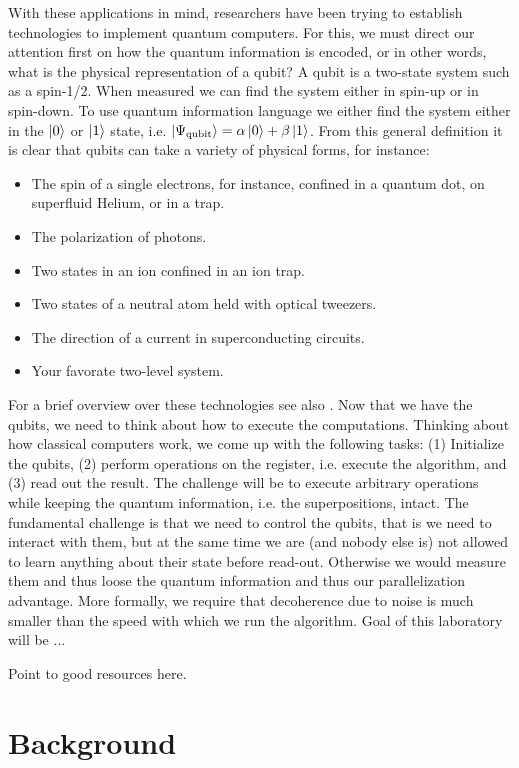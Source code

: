 \documentclass{../lab}
\begin{document}
With these applications in mind, researchers have been trying to establish technologies to implement quantum computers. For this, we must direct our attention first on how the quantum information is encoded, or in other words, what is the physical representation of a qubit?
A qubit is a two-state system such as a spin-1/2. When measured we can find the system either in spin-up or in spin-down. To use quantum information language we either find the system either in the $\ket{0}$ or $\ket{1}$ state, i.e. $\ket{\Psi_{\rm qubit}}=\alpha \ket{0}+\beta \ket{1}$. From this general definition it is clear that qubits can take a variety of physical forms, for instance: 
\begin{itemize}
    \item The spin of a single electrons, for instance, confined in a quantum dot, on superfluid Helium, or in a trap.
    \item The polarization of photons.
    \item Two states in an ion confined in an ion trap.
    \item Two states of a neutral atom held with optical tweezers. 
    \item The direction of a current in superconducting circuits.
    \item Your favorate two-level system.
\end{itemize}
For a brief overview over these technologies see also \cite{Ladd2010}. 
Now that we have the qubits, we need to think about how to execute the computations. Thinking about how classical computers work, we come up with the following tasks: (1) Initialize the qubits, (2) perform operations on the register, i.e. execute the algorithm, and (3) read out the result. The challenge will be to execute arbitrary operations while keeping the quantum information, i.e. the superpositions, intact. The fundamental challenge is that we need to control  the qubits, that is we need to interact with them, but at the same time we are (and nobody else is) not allowed to learn anything about their state before read-out. Otherwise we would measure them and thus loose the quantum information and thus our parallelization advantage. More formally, we require that decoherence due to noise is much smaller than the speed with which we run the algorithm. Goal of this laboratory will be ...

Point to good resources here. 

\section{Background}
\end{document}
